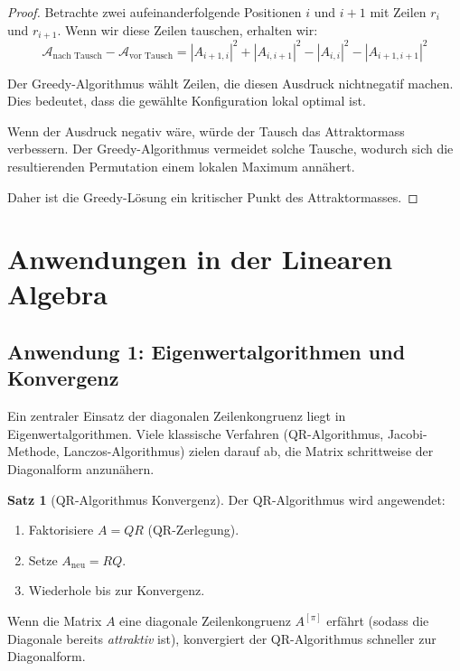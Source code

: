\documentclass[a4paper,12pt]{article}
\theoremstyle{definition}
\newtheorem{satz}{Satz}
\begin{document}
\begin{proof}
	Betrachte zwei aufeinanderfolgende Positionen $i$ und $i+1$ mit Zeilen $r_i$ und $r_{i+1}$. Wenn wir diese Zeilen tauschen, erhalten wir:
	\[
	\mathcal{A}_{\text{nach Tausch}} - \mathcal{A}_{\text{vor Tausch}} = |A_{i+1,i}|^2 + |A_{i,i+1}|^2 - |A_{i,i}|^2 - |A_{i+1,i+1}|^2
	\]
	
	Der Greedy-Algorithmus wählt Zeilen, die diesen Ausdruck nichtnegatif machen. Dies bedeutet, dass die gewählte Konfiguration lokal optimal ist.
	
	Wenn der Ausdruck negativ wäre, würde der Tausch das Attraktormass verbessern. Der Greedy-Algorithmus vermeidet solche Tausche, wodurch sich die resultierenden Permutation einem lokalen Maximum annähert.
	
	Daher ist die Greedy-Lösung ein kritischer Punkt des Attraktormasses.
\end{proof}

\section{Anwendungen in der Linearen Algebra}

\subsection{Anwendung 1: Eigenwertalgorithmen und Konvergenz}

Ein zentraler Einsatz der diagonalen Zeilenkongruenz liegt in Eigenwertalgorithmen. Viele klassische Verfahren (QR-Algorithmus, Jacobi-Methode, Lanczos-Algorithmus) zielen darauf ab, die Matrix schrittweise der Diagonalform anzunähern.

\begin{satz}[QR-Algorithmus Konvergenz]
	\label{satz:qr-konvergenz}
	Der QR-Algorithmus wird angewendet:
	\begin{enumerate}
		\item Faktorisiere $A = QR$ (QR-Zerlegung).
		\item Setze $A_{\text{neu}} = RQ$.
		\item Wiederhole bis zur Konvergenz.
	\end{enumerate}
	
	Wenn die Matrix $A$ eine diagonale Zeilenkongruenz $A^{[\pi]}$ erfährt (sodass die Diagonale bereits \emph{attraktiv} ist), konvergiert der QR-Algorithmus schneller zur Diagonalform.
\end{satz}
\end{document}
